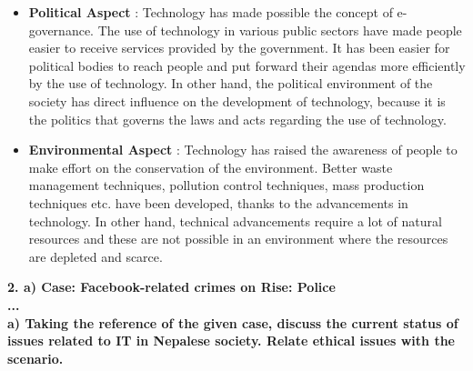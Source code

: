 \documentclass [12pt, a4paper]{article}
\begin{document}
\begin{itemize}
\item \textbf{Political Aspect} : Technology has made possible the concept of e-governance. The use of technology in various public sectors have made people easier to receive services provided by the government. It has been easier for political bodies to reach people and put forward their agendas more efficiently by the use of technology. In other hand, the political environment of the society has direct influence on the development of technology, because it is the politics that governs the laws and acts regarding the use of technology.

\item \textbf{Environmental Aspect} : Technology has raised the awareness of people to make effort on the conservation of the environment. Better waste management techniques, pollution control techniques, mass production techniques etc. have been developed, thanks to the advancements in technology. In other hand, technical advancements require a lot of natural resources and these are not possible in an environment where the resources are depleted and scarce.

\end{itemize}

\large
\textbf{2. a) Case: Facebook-related crimes on Rise: Police} \\
\textbf{...} \\
\normalsize
\textbf{a) Taking the reference of the given case, discuss the current status of issues related to IT in Nepalese society. Relate ethical issues with the scenario.} \\
\end{document}
